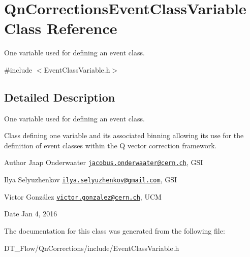 \hypertarget{classQnCorrectionsEventClassVariable}{}\section{Qn\+Corrections\+Event\+Class\+Variable Class Reference}
\label{classQnCorrectionsEventClassVariable}


One variable used for defining an event class.  




{\ttfamily \#include $<$Event\+Class\+Variable.\+h$>$}



\subsection{Detailed Description}
One variable used for defining an event class. 

Class defining one variable and its associated binning allowing its use for the definition of event classes within the Q vector correction framework.

\begin{DoxyAuthor}{Author}
Jaap Onderwaater \href{mailto:jacobus.onderwaater@cern.ch}{\tt jacobus.\+onderwaater@cern.\+ch}, G\+SI 

Ilya Selyuzhenkov \href{mailto:ilya.selyuzhenkov@gmail.com}{\tt ilya.\+selyuzhenkov@gmail.\+com}, G\+SI 

Víctor González \href{mailto:victor.gonzalez@cern.ch}{\tt victor.\+gonzalez@cern.\+ch}, U\+CM 
\end{DoxyAuthor}
\begin{DoxyDate}{Date}
Jan 4, 2016 
\end{DoxyDate}


The documentation for this class was generated from the following file\+:\begin{DoxyCompactItemize}
\item 
D\+T\+\_\+\+Flow/\+Qn\+Corrections/include/Event\+Class\+Variable.\+h\end{DoxyCompactItemize}
